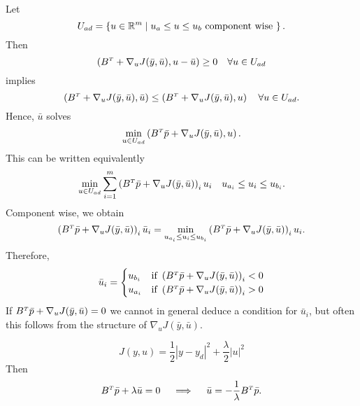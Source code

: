 \documentclass[../skript.tex]{subfiles}
\begin{document}
\begin{example}
Let
\[
U_{ad} = \left\{ u \in \mathbb{R}^m \mathrel{}\middle|\mathrel{} u_a \leq u \leq u_b \text{ component wise } \right\}.
\]
Then
\[
	\left( B^\tp + \nabla_u J(\bar{y}, \bar{u}), u - \bar{u} \right) \geq 0 \quad \forall u \in U_{ad}
\]
implies
\[
	\left( B^\tp + \nabla_u J(\bar{y}, \bar{u}), \bar{u} \right) \leq \left( B^\tp + \nabla_u J(\bar{y}, \bar{u}), u \right) \quad \forall u \in U_{ad}.
\]
Hence, $\bar{u}$ solves
\[
	\min_{u \in U_{ad}} \left( B^\tp \bar{p} + \nabla_u J(\bar{y}, \bar{u}), u \right).
\]
This can be written equivalently
\[
	\min_{u \in U_{ad}} \sum_{i=1}^m \left( B^\tp \bar{p} + \nabla_u J(\bar{y}, \bar{u}) \right)_i u_i \quad u_{a_i} \leq u_i \leq u_{b_i}.
\]
Component wise, we obtain
\[
	\left( B^\tp \bar{p} + \nabla_u J(\bar{y}, \bar{u}) \right)_i \bar{u}_i = \min_{u_{a_i} \leq u_i \leq u_{b_i}} \left( B^\tp \bar{p} + \nabla_u J(\bar{y}, \bar{u}) \right)_i u_i.
\]
Therefore,
\[
	\bar{u}_i = \begin{cases}
	u_{b_i} & \text{if } \left( B^\tp \bar{p} + \nabla_u J(\bar{y}, \bar{u}) \right)_i < 0 \\
	u_{a_i} & \text{if } \left( B^\tp \bar{p} + \nabla_u J(\bar{y}, \bar{u}) \right)_i > 0
	\end{cases}
\]
If $B^\tp \bar{p} + \nabla_u J(\bar{y}, \bar{u}) = 0$ we cannot in general deduce a condition for $\bar{u}_i$, but often this follows from the structure of $\nabla_u J(\bar{y}, \bar{u})$.
\begin{example}
\[
	J(y, u) = \frac{1}{2} |y -y_d|^2 + \frac{\lambda}{2} |u|^2
\]
Then
\[
	B^\tp \bar{p} + \lambda \bar{u} = 0 \quad \implies \quad \bar{u} = -\frac{1}{\lambda} B^\tp \bar{p}.
\]
\end{example}
\end{example}
\end{document}
